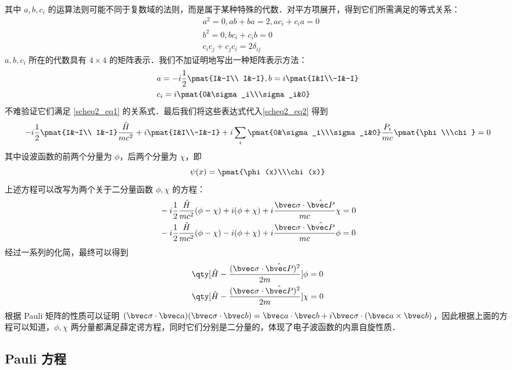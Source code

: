 其中 $a,b,c_i$ 的运算法则可能不同于复数域的法则，而是属于某种特殊的代数．对平方项展开，得到它们所需满足的等式关系：
\begin{equation}\label{scheq2_eq1}
\begin{aligned}
&a^2=0,ab+ba=2,ac_i+c_ia=0\\
&b^2=0,bc_i+c_ib=0\\
&c_ic_j+c_jc_i=2\delta_{ij}
\end{aligned}
\end{equation}
$a,b,c_i$ 所在的代数具有 $4\times 4$ 的矩阵表示．我们不加证明地写出一种矩阵表示方法：
\begin{equation}
\begin{aligned}
&a=-i\frac{1}{2}\pmat{I&-I\\ I&-I},b=i\pmat{I&I\\-I&-I}\\
&c_i=i\pmat{0&\sigma_i\\\sigma_i&0}
\end{aligned}
\end{equation}
不难验证它们满足 \autoref{scheq2_eq1} 的关系式．最后我们将这些表达式代入\autoref{scheq2_eq2} 得到
\begin{equation}
-i\frac{1}{2}\pmat{I&-I\\ I&-I} \frac{\hat H}{mc^2}+i\pmat{I&I\\-I&-I}+i\sum_i\pmat{0&\sigma_i\\\sigma_i&0} \frac{P_i}{mc}\pmat{\phi\\\chi}=0
\end{equation}
其中设波函数的前两个分量为 $\phi$，后两个分量为 $\chi$，即
\begin{equation}
\psi(x)=\pmat{\phi(x)\\\chi(x)}
\end{equation}
上述方程可以改写为两个关于二分量函数 $\phi,\chi$ 的方程：
\begin{equation}
\begin{aligned}
&-i\frac{1}{2}\frac{\hat H}{mc^2}(\phi-\chi)+i(\phi+\chi)+i\frac{\bvec \sigma\cdot \hat{\bvec P}}{mc}\chi=0\\
&-i\frac{1}{2}\frac{\hat H}{mc^2}(\phi-\chi)-i(\phi+\chi)+i\frac{\bvec \sigma\cdot \hat{\bvec P}}{mc}\phi=0
\end{aligned}
\end{equation}
经过一系列的化简，最终可以得到
\begin{equation}
\begin{aligned}
&\qty[\hat H-\frac{(\bvec \sigma\cdot \hat{\bvec P})^2}{2m}]\phi=0\\
&
\qty[\hat H-\frac{(\bvec \sigma\cdot \hat{\bvec P})^2}{2m}]\chi=0
\end{aligned}
\end{equation}
根据 Pauli 矩阵的性质可以证明 $(\bvec \sigma\cdot \bvec a)(\bvec \sigma\cdot \bvec b)=\bvec a\cdot \bvec b+i\bvec \sigma\cdot (\bvec a\times \bvec b)$，因此根据上面的方程可以知道，$\phi,\chi$ 两分量都满足薛定谔方程，同时它们分别是二分量的，体现了电子波函数的内禀自旋性质．

\subsection{Pauli 方程}